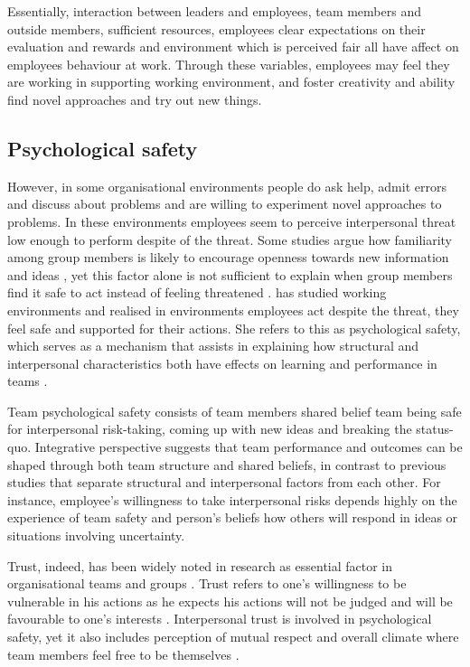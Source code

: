 Essentially, interaction between leaders and employees, team members and outside members, sufficient resources, employees clear expectations on their evaluation and rewards and environment which is perceived fair all have affect on employees behaviour at work. Through these variables, employees may feel they are working in supporting working environment, and foster creativity and ability find novel approaches and try out new things. \citep{shalley2004leaders}

\subsection{Psychological safety}
However, in some organisational environments people do ask help, admit errors and discuss about problems and are willing to experiment novel approaches to problems. In these environments employees seem to perceive interpersonal threat low enough to perform despite of the threat. Some studies argue how familiarity among group members is likely to encourage openness towards new information and ideas \citep{sanna1990valence}, yet this factor alone is not sufficient to explain when group members find it safe to act instead of feeling threatened \citep{edmondson1999psychological}. \citet{edmondson1999psychological} has studied working environments and realised in environments employees act despite the threat, they feel safe and supported for their actions. She refers to this as psychological safety, which serves as a mechanism that assists in explaining how structural and interpersonal characteristics both have effects on learning and performance in teams \citep{edmondson1999psychological}.  

Team psychological safety consists of team members shared belief team being safe for interpersonal risk-taking, coming up with new ideas and breaking the status-quo. Integrative perspective suggests that team performance and outcomes can be shaped through both team structure and shared beliefs, in contrast to previous studies that separate structural and interpersonal factors from each other. For instance, employee's willingness to take interpersonal risks depends highly on the experience of team safety and person's beliefs how others will respond in ideas or situations involving uncertainty. \citep{edmondson1999psychological}

Trust, indeed, has been widely noted in research as essential factor in organisational teams and groups \citep{golembiewski1975centrality,kramer1999trust,shalley2004leaders,edmondson1999psychological}. Trust refers to one's willingness to be vulnerable in his actions as he expects his actions will not be judged and will be favourable to one's interests \citep{robinson1997corporate}. Interpersonal trust is involved in psychological safety, yet it also includes perception of mutual respect and overall climate where team members feel free to be themselves \citep{edmondson1999psychological}. 

